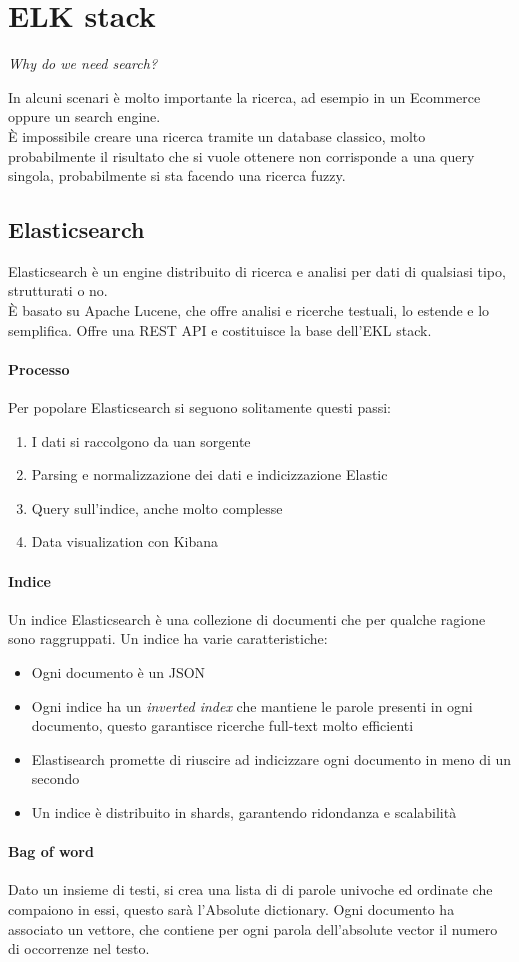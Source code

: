 \section{ELK stack}
\begin{center}
    \emph{Why do we need search?}
\end{center}
In alcuni scenari è molto importante la ricerca, ad esempio in un Ecommerce oppure
un search engine.\\
È impossibile creare una ricerca tramite un database classico, molto probabilmente
il risultato che si vuole ottenere non corrisponde a una query singola, probabilmente
si sta facendo una ricerca fuzzy.

\subsection{Elasticsearch}
Elasticsearch è un engine distribuito di ricerca e analisi per dati di qualsiasi tipo, 
strutturati o no.\\
È basato su Apache Lucene, che offre analisi e ricerche testuali, lo estende e lo semplifica.
Offre una REST API e costituisce la base dell'EKL stack.

\paragraph{Processo}
Per popolare Elasticsearch si seguono solitamente questi passi:
\begin{enumerate}
    \item I dati si raccolgono da uan sorgente
    \item Parsing e normalizzazione dei dati e indicizzazione Elastic
    \item Query sull'indice, anche molto complesse
    \item Data visualization con Kibana
\end{enumerate}

\paragraph{Indice}
Un indice Elasticsearch è una collezione di documenti che per qualche ragione sono raggruppati.
Un indice ha varie caratteristiche:
\begin{itemize}
    \item Ogni documento è un JSON
    \item Ogni indice ha un \emph{inverted index} che mantiene le parole presenti in ogni documento, 
    questo garantisce ricerche full-text molto efficienti
    \item Elastisearch promette di riuscire ad indicizzare ogni documento in meno di un secondo
    \item Un indice è distribuito in shards, garantendo ridondanza e scalabilità
\end{itemize}

\paragraph{Bag of word}
Dato un insieme di testi, si crea una lista di di parole univoche ed ordinate che compaiono in essi, 
questo sarà l'Absolute dictionary.
Ogni documento ha associato un vettore, che contiene per ogni parola dell'absolute vector
il numero di occorrenze nel testo.

